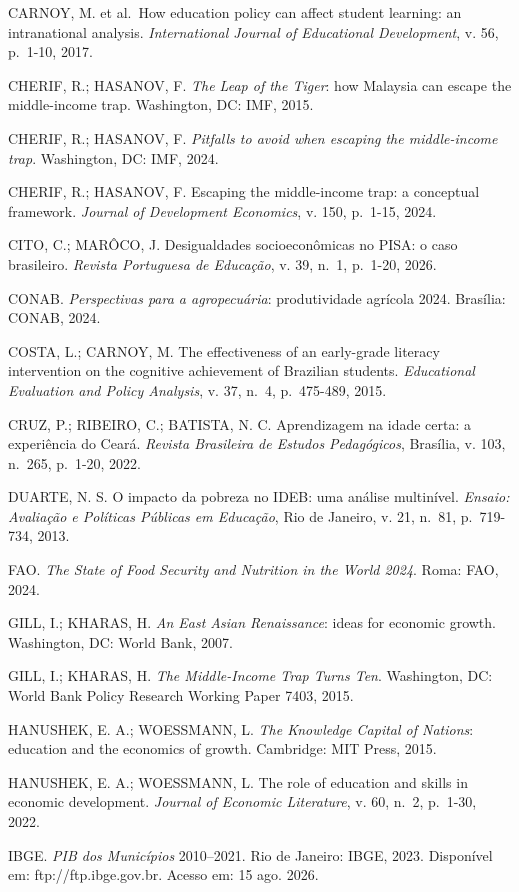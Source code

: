 \documentclass[
  brazilian,
  12pt,
  a4paper,
]{article}
\begin{document}
CARNOY, M. et al.~How education policy can affect student learning: an
intranational analysis. \emph{International Journal of Educational
Development}, v. 56, p.~1-10, 2017.

CHERIF, R.; HASANOV, F. \emph{The Leap of the Tiger}: how Malaysia can
escape the middle-income trap. Washington, DC: IMF, 2015.

CHERIF, R.; HASANOV, F. \emph{Pitfalls to avoid when escaping the
middle-income trap}. Washington, DC: IMF, 2024.

CHERIF, R.; HASANOV, F. Escaping the middle-income trap: a conceptual
framework. \emph{Journal of Development Economics}, v. 150, p.~1-15,
2024.

CITO, C.; MARÔCO, J. Desigualdades socioeconômicas no PISA: o caso
brasileiro. \emph{Revista Portuguesa de Educação}, v. 39, n.~1, p.~1-20,
2026.

CONAB. \emph{Perspectivas para a agropecuária}: produtividade agrícola
2024. Brasília: CONAB, 2024.

COSTA, L.; CARNOY, M. The effectiveness of an early-grade literacy
intervention on the cognitive achievement of Brazilian students.
\emph{Educational Evaluation and Policy Analysis}, v. 37, n.~4,
p.~475-489, 2015.

CRUZ, P.; RIBEIRO, C.; BATISTA, N. C. Aprendizagem na idade certa: a
experiência do Ceará. \emph{Revista Brasileira de Estudos Pedagógicos},
Brasília, v. 103, n.~265, p.~1-20, 2022.

DUARTE, N. S. O impacto da pobreza no IDEB: uma análise multinível.
\emph{Ensaio: Avaliação e Políticas Públicas em Educação}, Rio de
Janeiro, v. 21, n.~81, p.~719-734, 2013.

FAO. \emph{The State of Food Security and Nutrition in the World 2024}.
Roma: FAO, 2024.

GILL, I.; KHARAS, H. \emph{An East Asian Renaissance}: ideas for
economic growth. Washington, DC: World Bank, 2007.

GILL, I.; KHARAS, H. \emph{The Middle-Income Trap Turns Ten}.
Washington, DC: World Bank Policy Research Working Paper 7403, 2015.

HANUSHEK, E. A.; WOESSMANN, L. \emph{The Knowledge Capital of Nations}:
education and the economics of growth. Cambridge: MIT Press, 2015.

HANUSHEK, E. A.; WOESSMANN, L. The role of education and skills in
economic development. \emph{Journal of Economic Literature}, v. 60,
n.~2, p.~1-30, 2022.

IBGE. \emph{PIB dos Municípios} 2010--2021. Rio de Janeiro: IBGE, 2023.
Disponível em: ftp://ftp.ibge.gov.br. Acesso em: 15 ago. 2026.
\end{document}
